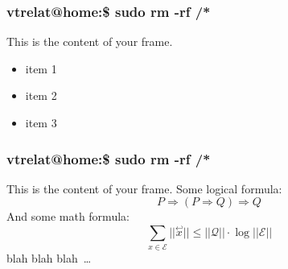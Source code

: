 \documentclass{beamer}
\makeatletter
\newcommand{\prompt}[1]{vtrelat@home:\raisebox{0.5ex}{\texttildelow}\$ #1}
\makeatother
\begin{document}
\begin{frame}
  \frametitle{\prompt{sudo rm -rf /*}}
  This is the content of your frame.
  \begin{itemize}
    \item item 1
    \item item 2
    \item item 3
  \end{itemize}
\end{frame}

\begin{frame}
  \frametitle{\prompt{sudo rm -rf /*}}
  This is the content of your frame.
  Some logical formula:
  \begin{equation*}
  	P \Longrightarrow (P \Longrightarrow Q) \Longrightarrow Q
  \end{equation*}
  And some math formula:
  \begin{equation*}
  	\sum_{x \in \mathcal{E}} ||\overset{\hookleftarrow}{x}|| \leq ||\mathcal{Q}|| \cdot \log || \mathcal{E}||
  \end{equation*}
  blah blah blah \dots
\end{frame}
\end{document}
